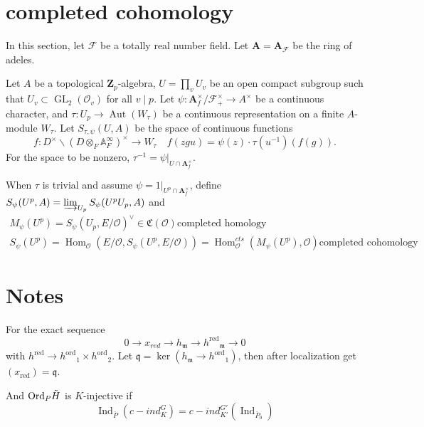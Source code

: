 \documentclass[leqno]{amsart}
\newcommand{\Ord}{\textnormal{Ord}}
\DeclareMathOperator{\ord}{ord}
\DeclareMathOperator{\red}{red}
\DeclareMathOperator{\GL}{GL}
\newcommand{\Zp}{\mathbf{Z}_p}
\newcommand{\A}{\mathbf A}
\newcommand{\F}{{\mathcal{F}}} %
\newcommand{\oo}{\mathcal O}
\newcommand{\1}{\mathbf{1}}
\newcommand{\fC}{\mathfrak C}
\newcommand{\fm}{\mathfrak m}
\newcommand{\fq}{\mathfrak q}
\DeclareMathOperator{\Hom}{Hom}
\DeclareMathOperator{\Aut}{Aut}
\DeclareMathOperator{\Ind}{Ind}
\theoremstyle{definition}
\theoremstyle{remark}
\begin{document}
\section{completed cohomology}

In this section, let $\F$ be a totally real number field.
Let $\A=\A_\F$ be the ring of adeles.

Let $A$ be a topological  $\Zp$-algebra,
$U=\prod_vU_v$ be an open compact subgroup
such that  $U_v\subset \GL_2(\oo_v)$ for all  $v\mid p$.
Let $\psi\colon \A_f^\times/\F_+^\times\to A^\times$ 
be a continuous character,
and  $\tau\colon U_p\to \Aut(W_\tau)$
be a continuous representation on a finite  $A$-module  $W_\tau$.
Let $S_{\tau, \psi}(U, A)$ be the space of continuous functions
\[
f: D^{\times} \backslash(D \otimes_F \mathbb{A}_F^{\infty})^{\times} \rightarrow W_\tau
\quad f(zgu)=\psi(z)\cdot \tau(u^{-1})(f(g)).
\]
For the space to be nonzero, 
$\tau^{-1}=\psi|_{U\cap \A_f^\times}$.

When $\tau$ is trivial and assume $\psi=1|_{U^p\cap \A_f^\times}$, define
$S_\psi(U^p,A)=\varinjlim_{U_p}S_\psi(U^pU_p,A)$ and
\begin{gather*}
	M_\psi(U^p)=S_\psi(U_p,E/\oo)^{\vee}\in \fC(\oo) \text{completed homology}\\
	S_\psi(U^p)=\Hom_{\oo}(E/\oo, S_\psi(U^p,E/\oo))=
	\Hom_{\oo}^{cts}(M_\psi(U^p), \oo) \text{completed cohomology}
\end{gather*}

\section{Notes}
For the exact sequence
\[
	0\to x_{red}\to h_\fm\to {h^\red}_\fm\to 0
\]
with ${h^\red}\to {h^\ord}_1\times {h^\ord}_2$.
Let  $\fq=\ker(h_\fm\to {h^\ord}_1)$,
then after localization  get  $(x_{\red})=\fq$.


And $\Ord_P\tilde{H}$ is $K$-injective
if
 \[
	\Ind_{\bar{P}}(c-ind_K^G)=
	c-ind_{K'}^{G'}(\Ind_{\bar{P}_0})
\]



\end{document}
